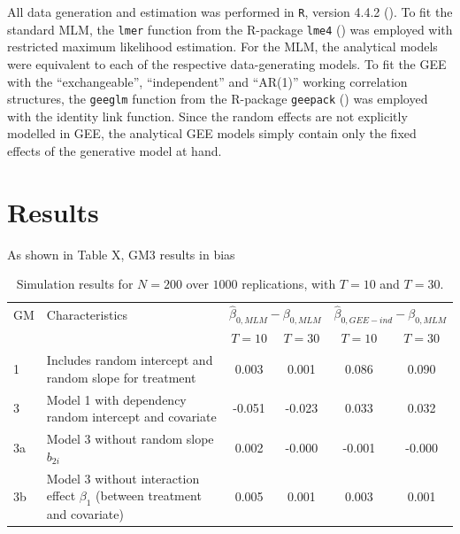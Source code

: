 \documentclass[
  12pt,
  a4paper,
]{article}
\begin{document}
All data generation and estimation was performed in \texttt{R}, version
4.4.2 (). To fit the standard
MLM, the \texttt{lmer} function from the R-package \texttt{lme4}
() was employed with
restricted maximum likelihood estimation. For the MLM, the analytical
models were equivalent to each of the respective data-generating models.
To fit the GEE with the ``exchangeable'', ``independent'' and ``AR(1)''
working correlation structures, the \texttt{geeglm} function from the
R-package \texttt{geepack} () was employed with the identity link function. Since the random
effects are not explicitly modelled in GEE, the analytical GEE models
simply contain only the fixed effects of the generative model at hand.

\section{Results}\label{results}

As shown in Table X, GM3 results in bias

\begin{table}[H]
    \caption{Simulation results for $N=200$ over $1000$ replications, with $T=10$ and $T=30$.}
    \centering
    \begin{tabular}{@{}p{1.5cm} p{5cm} cc cc@{}}
        \toprule
        GM & Characteristics & \multicolumn{2}{c}{$\hat{\beta}_{0,MLM}-\beta_{0,MLM}$} & \multicolumn{2}{c}{$\hat{\beta}_{0,GEE-ind}-\beta_{0,MLM}$} \\ 
        \cmidrule(lr){3-4} \cmidrule(lr){5-6}
           &                 & \( T = 10 \) & \( T = 30 \) & \( T = 10 \) & \( T = 30 \) \\ \midrule
        1  & Includes random intercept and random slope for treatment & 0.003 & 0.001 & 0.086 & 0.090 \\
        3  & Model 1 with dependency random intercept and covariate       & -0.051 & -0.023 & 0.033 & 0.032 \\
        3a & Model 3 without random slope $b_{2i}$           & 0.002 & -0.000 & -0.001 & -0.000 \\
        3b & Model 3 without interaction effect $\beta_1$ (between treatment and covariate) & 0.005 & 0.001 & 0.003 & 0.001 \\
        \bottomrule
    \end{tabular}
\end{table}
\end{document}
